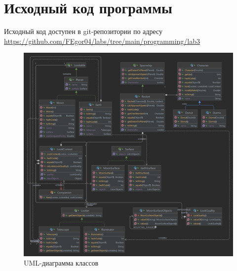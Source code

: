 \section{Исходный код программы}
Исходный код доступен в git-репозитории по адресу \url{https://github.com/FEgor04/labs/tree/main/programming/lab3}

\begin{figure}[ht]
    \centering
    \includegraphics[width=\textwidth]{img/uml.png}
    \caption[]{UML-диаграмма классов}
\end{figure}